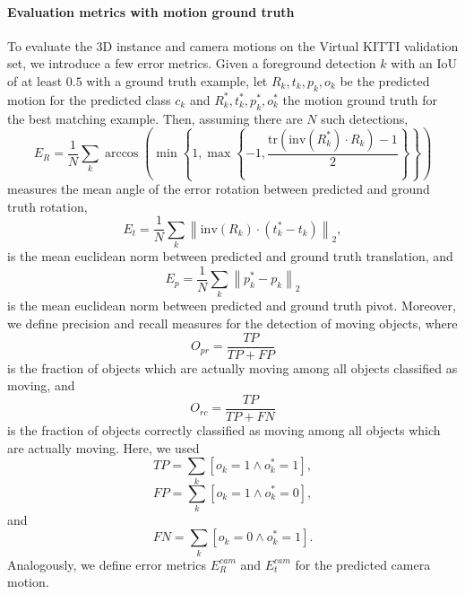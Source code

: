 \paragraph{Evaluation metrics with motion ground truth}
To evaluate the 3D instance and camera motions on the Virtual KITTI validation
set, we introduce a few error metrics.
Given a foreground detection $k$ with an IoU of at least $0.5$ with a ground truth example,
let $R_k, t_k, p_k, o_k$ be the predicted motion for the predicted class $c_k$
and $R_k^*, t_k^*, p_k^*, o_k^*$ the motion ground truth for the best matching example.
Then, assuming there are $N$ such detections,
\begin{equation}
E_{R} = \frac{1}{N}\sum_k \arccos\left( \min\left\{1, \max\left\{-1, \frac{\mathrm{tr}(\mathrm{inv}(R_k^*) \cdot R_k) - 1}{2} \right\}\right\} \right)
\end{equation}
measures the mean angle of the error rotation between predicted and ground truth rotation,
\begin{equation}
E_{t} = \frac{1}{N}\sum_k  \left\lVert \mathrm{inv}(R_k) \cdot (t_k^* - t_k) \right\rVert_2,
\end{equation}
is the mean euclidean norm between predicted and ground truth translation, and
\begin{equation}
E_{p} = \frac{1}{N}\sum_k \left\lVert p_k^* - p_k \right\rVert_2
\end{equation}
is the mean euclidean norm between predicted and ground truth pivot.
Moreover, we define precision and recall measures for the detection of moving objects,
where
\begin{equation}
O_{pr} = \frac{\mathit{TP}}{\mathit{TP} + \mathit{FP}}
\end{equation}
is the fraction of objects which are actually moving among all objects classified as moving,
and
\begin{equation}
O_{rc} = \frac{\mathit{TP}}{\mathit{TP} + \mathit{FN}}
\end{equation}
is the fraction of objects correctly classified as moving among all objects which are actually moving.
Here, we used
\begin{equation}
\mathit{TP} = \sum_k [o_k = 1 \land o_k^* = 1],
\end{equation}
\begin{equation}
\mathit{FP} = \sum_k [o_k = 1 \land o_k^* = 0],
\end{equation}
and
\begin{equation}
\mathit{FN} = \sum_k [o_k = 0 \land o_k^* = 1].
\end{equation}
Analogously, we define error metrics $E_{R}^{cam}$ and $E_{t}^{cam}$ for
the predicted camera motion.

